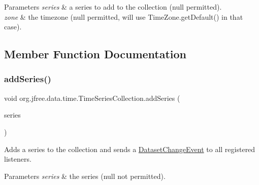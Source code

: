 \begin{DoxyParams}{Parameters}
{\em series} & a series to add to the collection ({\ttfamily null} permitted). \\
\hline
{\em zone} & the timezone ({\ttfamily null} permitted, will use {\ttfamily Time\+Zone.\+get\+Default()} in that case). \\
\hline
\end{DoxyParams}


\subsection{Member Function Documentation}
\mbox{\label{classorg_1_1jfree_1_1data_1_1time_1_1_time_series_collection_af7eb42991d3d0e8857fbfa51ff8501fc}} 
\subsubsection{\texorpdfstring{add\+Series()}{addSeries()}}
{\footnotesize\ttfamily void org.\+jfree.\+data.\+time.\+Time\+Series\+Collection.\+add\+Series (\begin{DoxyParamCaption}\item[{\mbox{\hyperlink{classorg_1_1jfree_1_1data_1_1time_1_1_time_series}{Time\+Series}}}]{series }\end{DoxyParamCaption})}

Adds a series to the collection and sends a \mbox{\hyperlink{}{Dataset\+Change\+Event}} to all registered listeners.


\begin{DoxyParams}{Parameters}
{\em series} & the series ({\ttfamily null} not permitted). \\
\hline
\end{DoxyParams}
\mbox{\label{classorg_1_1jfree_1_1data_1_1time_1_1_time_series_collection_a3577143a3f77c41124f05211c00662db}} 
